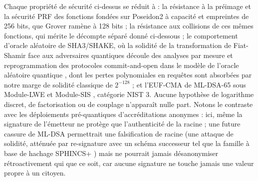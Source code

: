 \documentclass[11pt]{article}
\theoremstyle{definition}
\begin{document}
Chaque propriété de sécurité ci-dessus se réduit à : la résistance à la préimage et la
sécurité PRF des fonctions fondées sur Poseidon2 à capacité et empreintes de 256 bits, que
Grover \cite{grover} ramène à 128 bits ; la résistance aux collisions de ces mêmes
fonctions, qui mérite le décompte séparé donné ci-dessous ; le comportement d'oracle
aléatoire de SHA3/SHAKE, où la solidité de la transformation de Fiat-Shamir face aux
adversaires quantiques découle des analyses par mesure et reprogrammation des protocoles
commit-and-open dans le modèle de l'oracle aléatoire quantique \cite{qromfs}, dont les
pertes polynomiales en requêtes sont absorbées par notre marge de solidité classique de
$2^{-128}$ ; et l'EUF-CMA de ML-DSA-65 sous Module-LWE et Module-SIS
\cite{regev,dilithium}, catégorie NIST 3. Aucune hypothèse de logarithme discret, de
factorisation ou de couplage n'apparaît nulle part. Notons le contraste avec les
déploiements pré-quantiques d'accréditations anonymes : ici, même la signature de
l'émetteur ne protège que l'authenticité de la racine ; une future cassure de ML-DSA
permettrait une falsification de racine (une attaque de solidité, atténuée par
re-signature avec un schéma successeur tel que la famille à base de hachage SPHINCS+
\cite{sphincs}) mais ne pourrait jamais désanonymiser rétroactivement qui que ce soit, car
aucune signature ne touche jamais une valeur propre à un citoyen.
\end{document}
